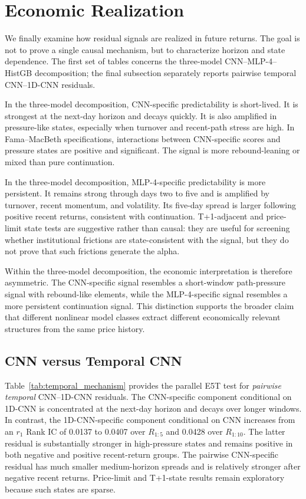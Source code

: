 \section{Economic Realization}

We finally examine how residual signals are realized in future returns. The goal is not to prove a single causal mechanism, but to characterize horizon and state dependence. The first set of tables concerns the three-model CNN--MLP-4--HistGB decomposition; the final subsection separately reports pairwise temporal CNN--1D-CNN residuals.






In the three-model decomposition, CNN-specific predictability is short-lived. It is strongest at the next-day horizon and decays quickly. It is also amplified in pressure-like states, especially when turnover and recent-path stress are high. In Fama--MacBeth specifications, interactions between CNN-specific scores and pressure states are positive and significant. The signal is more rebound-leaning or mixed than pure continuation.

In the three-model decomposition, MLP-4-specific predictability is more persistent. It remains strong through days two to five and is amplified by turnover, recent momentum, and volatility. Its five-day spread is larger following positive recent returns, consistent with continuation. T+1-adjacent and price-limit state tests are suggestive rather than causal: they are useful for screening whether institutional frictions are state-consistent with the signal, but they do not prove that such frictions generate the alpha.

Within the three-model decomposition, the economic interpretation is therefore asymmetric. The CNN-specific signal resembles a short-window path-pressure signal with rebound-like elements, while the MLP-4-specific signal resembles a more persistent continuation signal. This distinction supports the broader claim that different nonlinear model classes extract different economically relevant structures from the same price history.

\subsection{CNN versus Temporal CNN}

Table~\ref{tab:temporal_mechanism} provides the parallel E5T test for \emph{pairwise temporal} CNN--1D-CNN residuals. The CNN-specific component conditional on 1D-CNN is concentrated at the next-day horizon and decays over longer windows. In contrast, the 1D-CNN-specific component conditional on CNN increases from an $r_1$ Rank IC of 0.0137 to 0.0407 over $R_{1:5}$ and 0.0428 over $R_{1:10}$. The latter residual is substantially stronger in high-pressure states and remains positive in both negative and positive recent-return groups. The pairwise CNN-specific residual has much smaller medium-horizon spreads and is relatively stronger after negative recent returns. Price-limit and T+1-state results remain exploratory because such states are sparse.


